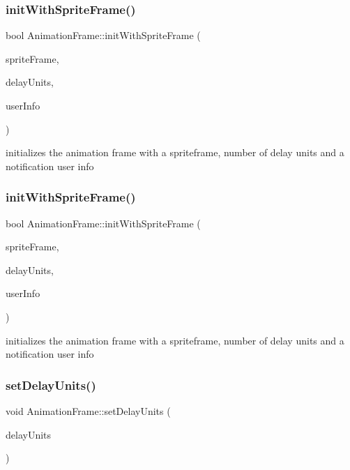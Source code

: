 \subsubsection{\texorpdfstring{init\+With\+Sprite\+Frame()}{initWithSpriteFrame()}\hspace{0.1cm}{\footnotesize\ttfamily [1/2]}}
{\footnotesize\ttfamily bool Animation\+Frame\+::init\+With\+Sprite\+Frame (\begin{DoxyParamCaption}\item[{\hyperlink{classSpriteFrame}{Sprite\+Frame} $\ast$}]{sprite\+Frame,  }\item[{float}]{delay\+Units,  }\item[{const Value\+Map \&}]{user\+Info }\end{DoxyParamCaption})}

initializes the animation frame with a spriteframe, number of delay units and a notification user info \mbox{\label{classAnimationFrame_a161dcf4b8dfa1c8cb262a5f77c22dc94}} 
\subsubsection{\texorpdfstring{init\+With\+Sprite\+Frame()}{initWithSpriteFrame()}\hspace{0.1cm}{\footnotesize\ttfamily [2/2]}}
{\footnotesize\ttfamily bool Animation\+Frame\+::init\+With\+Sprite\+Frame (\begin{DoxyParamCaption}\item[{\hyperlink{classSpriteFrame}{Sprite\+Frame} $\ast$}]{sprite\+Frame,  }\item[{float}]{delay\+Units,  }\item[{const Value\+Map \&}]{user\+Info }\end{DoxyParamCaption})}

initializes the animation frame with a spriteframe, number of delay units and a notification user info \mbox{\label{classAnimationFrame_afb9b22fd6b69fe33245df07fec1ce125}} 
\subsubsection{\texorpdfstring{set\+Delay\+Units()}{setDelayUnits()}\hspace{0.1cm}{\footnotesize\ttfamily [1/2]}}
{\footnotesize\ttfamily void Animation\+Frame\+::set\+Delay\+Units (\begin{DoxyParamCaption}\item[{float}]{delay\+Units }\end{DoxyParamCaption})\hspace{0.3cm}{\ttfamily [inline]}}

